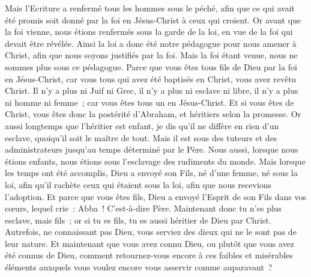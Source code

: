 \begin{multicols}{2}
Mais l'Ecriture a renfermé tous les hommes sous le péché, afin que ce qui avait été promis soit donné par la foi en Jésus-Christ à ceux qui croient.
Or avant que la foi vienne, nous étions renfermés sous la garde de la loi, en vue de la foi qui devait être révélée.
Ainsi la loi a donc été notre pédagogue pour nous amener à Christ, afin que nous soyons justifiés par la foi.
Mais la foi étant venue, nous ne sommes plus sous ce pédagogue.
Parce que vous êtes tous fils de Dieu par la foi en Jésus-Christ,
car vous tous qui avez été baptisés en Christ, vous avez revêtu Christ.
Il n'y a plus ni Juif ni Grec, il n'y a plus ni esclave ni libre, il n'y a plus ni homme ni femme~; car vous êtes tous un en Jésus-Christ.
Et si vous êtes de Christ, vous êtes donc la postérité d'Abraham, et héritiers selon la promesse.
\VerseOne{}Or aussi longtemps que l'héritier est enfant, je dis qu'il ne diffère en rien d'un esclave, quoiqu'il soit le maître de tout.
Mais il est sous des tuteurs et des administrateurs jusqu'au temps déterminé par le Père.
Nous aussi, lorsque nous étions enfants, nous étions sous l'esclavage des rudiments du monde.
Mais lorsque les temps ont été accomplis, Dieu a envoyé son Fils, né d'une femme, né sous la loi,
afin qu'il rachète ceux qui étaient sous la loi, afin que nous recevions l'adoption.
Et parce que vous êtes fils, Dieu a envoyé l'Esprit de son Fils dans vos cœurs, lequel crie~: Abba~! C'est-à-dire Père.
Maintenant donc tu n'es plus esclave, mais fils~; or si tu es fils, tu es aussi héritier de Dieu par Christ.
Autrefois, ne connaissant pas Dieu, vous serviez des dieux qui ne le sont pas de leur nature.
Et maintenant que vous avez connu Dieu, ou plutôt que vous avez été connus de Dieu, comment retournez-vous encore à ces faibles et misérables éléments auxquels vous voulez encore vous asservir comme auparavant~?

\end{multicols}
